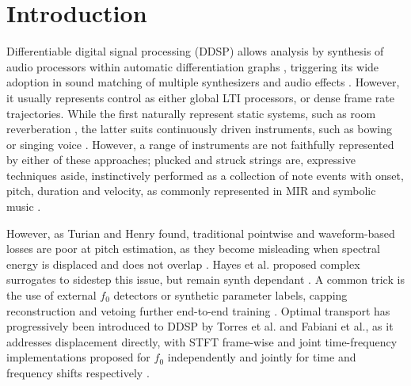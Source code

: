 \documentclass[conference]{IEEEtran}
\newcommand{\ddsp}{DDSP}
\begin{document}
\section{Introduction}
Differentiable digital signal processing (\ddsp) allows analysis by synthesis of audio processors within automatic differentiation graphs \cite{engel2020ddsp}, triggering its wide adoption in sound matching of multiple synthesizers and audio effects \cite{caspe2022ddx7,carson2026gradient}. However, it usually represents control as either global LTI processors, or dense frame rate trajectories. While the first naturally represent static systems, such as room reverberation \cite{dalsanto2025flamo}, the latter suits continuously driven instruments, such as bowing or singing voice \cite{sudholt2023vocal}. However, a range of instruments are not faithfully represented by either of these approaches; plucked and struck strings are, expressive techniques aside, instinctively performed as a collection of note events with onset, pitch, duration and velocity, as commonly represented in MIR and symbolic music \cite{hawthorne2018onsets}.

However, as Turian and Henry found, traditional pointwise and waveform-based losses are poor at pitch estimation, as they become misleading when spectral energy is displaced and does not overlap \cite{turian2020loss}. Hayes et al. proposed complex surrogates to sidestep this issue, but remain synth dependant \cite{hayes2023sinusoidal}. A common trick is the use of external $f_0$ detectors or synthetic parameter labels, capping reconstruction and vetoing further end-to-end training \cite{engel2020ddsp, engel2020inverse}. Optimal transport has progressively been introduced to DDSP by Torres et al. and Fabiani et al., as it addresses displacement directly, with STFT frame-wise and joint time-frequency implementations proposed for $f_0$ independently and jointly for time and frequency shifts respectively \cite{torres2024sot, fabiani2024jtfot}.
\end{document}
